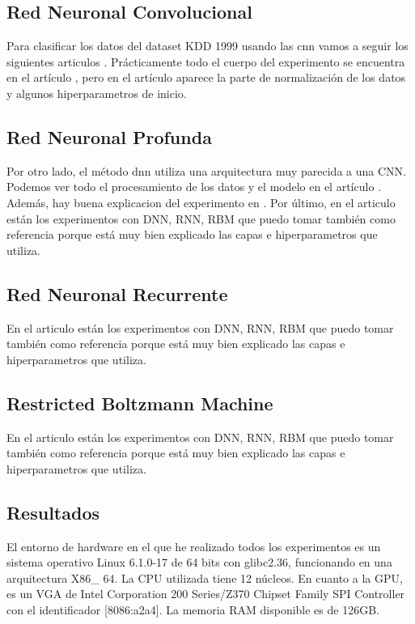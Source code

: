 \subsection{Red Neuronal Convolucional}
Para clasificar los datos del dataset KDD 1999 usando las \gls{cnn} vamos a seguir los siguientes articulos \citep{kim2020cnn, yang2006anomaly, nguyen2018design, kim2018encoding}. Prácticamente todo el cuerpo del experimento se encuentra en el artículo \citep{kim2020cnn}, pero en el artículo \citep{kim2018encoding} aparece la parte de normalización de los datos y algunos hiperparametros de inicio.

\subsection{Red Neuronal Profunda}
Por otro lado, el método \gls{dnn} utiliza una arquitectura muy parecida a una CNN. Podemos ver todo el procesamiento de los datos y el modelo en el artículo \citep{maithem2021network}. Además, hay buena explicacion del experimento en \citep{vigneswaran2018evaluating}. Por último, en el articulo \citep{elmasry2019empirical} están los experimentos con DNN, RNN,  RBM que puedo tomar también como referencia porque está muy bien explicado las capas e hiperparametros que utiliza.

\subsection{Red Neuronal Recurrente}
En el articulo \citep{elmasry2019empirical} están los experimentos con DNN, RNN,  RBM que puedo tomar también como referencia porque está muy bien explicado las capas e hiperparametros que utiliza.

\subsection{Restricted Boltzmann Machine}
En el articulo \citep{elmasry2019empirical} están los experimentos con DNN, RNN,  RBM que puedo tomar también como referencia porque está muy bien explicado las capas e hiperparametros que utiliza.


\subsection{Resultados}
El entorno de hardware en el que he realizado todos los experimentos es un sistema operativo Linux 6.1.0-17 de 64 bits con glibc2.36, funcionando en una arquitectura X86\_ 64. La CPU utilizada tiene 12 núcleos. En cuanto a la GPU, es un VGA de Intel Corporation 200 Series/Z370 Chipset Family SPI Controller con el identificador [8086:a2a4]. La memoria RAM disponible es de 126GB.



